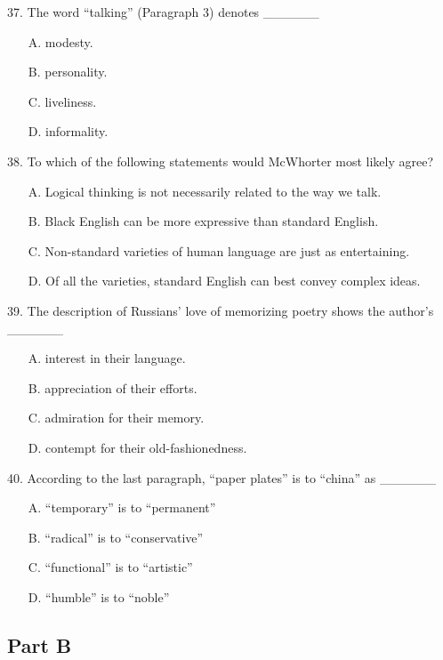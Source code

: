 \documentclass[UTF8,11pt]{ctexart}
\begin{document}
37. The word “talking” (Paragraph 3) denotes \_\_\_\_\_\_


\begin{itemize}[leftmargin=2em,itemsep=.2em,topsep=.4em]\item[A.] modesty.
\item[B.] personality.
\item[C.] liveliness.
\item[D.] informality.
\end{itemize}

38. To which of the following statements would McWhorter most likely agree?


\begin{itemize}[leftmargin=2em,itemsep=.2em,topsep=.4em]\item[A.] Logical thinking is not necessarily related to the way we talk.
\item[B.] Black English can be more expressive than standard English.
\item[C.] Non-standard varieties of human language are just as entertaining.
\item[D.] Of all the varieties, standard English can best convey complex ideas.
\end{itemize}

39. The description of Russians’ love of memorizing poetry shows the author’s \_\_\_\_\_\_


\begin{itemize}[leftmargin=2em,itemsep=.2em,topsep=.4em]\item[A.] interest in their language.
\item[B.] appreciation of their efforts.
\item[C.] admiration for their memory.
\item[D.] contempt for their old-fashionedness.
\end{itemize}

40. According to the last paragraph, “paper plates” is to “china” as \_\_\_\_\_\_


\begin{itemize}[leftmargin=2em,itemsep=.2em,topsep=.4em]\item[A.] “temporary” is to “permanent”
\item[B.] “radical” is to “conservative”
\item[C.] “functional” is to “artistic”
\item[D.] “humble” is to “noble”
\end{itemize}

\subsection*{\textbf{Part B}}
\end{document}

